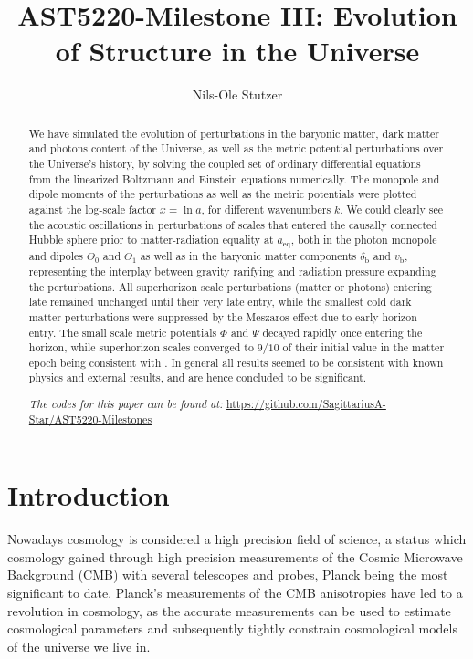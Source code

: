 \documentclass[twocolumn]{aastex62}
\begin{document}
\title{\Large AST5220-Milestone III: Evolution of Structure in the Universe}

\author{Nils-Ole Stutzer}

\begin{abstract}
    We have simulated the evolution of perturbations in the baryonic matter, dark matter and photons content of the Universe, as well as the metric potential perturbations over the Universe's history, by solving the coupled set of ordinary differential equations from the linearized Boltzmann and Einstein equations numerically. The monopole and dipole moments of the perturbations as well as the metric potentials were plotted against the log-scale factor $x = \ln a$, for different wavenumbers $k$. We could clearly see the acoustic oscillations in perturbations of scales that entered the causally connected Hubble sphere prior to matter-radiation equality at $a_\text{eq}$, both in the photon monopole and dipoles $\Theta_0$ and $\Theta_1$ as well as in the baryonic matter components $\delta_\text{b}$ and $v_\text{b}$, representing the interplay between gravity rarifying and radiation pressure expanding the perturbations. All superhorizon scale perturbations (matter or photons) entering late remained unchanged until their very late entry, while the smallest cold dark matter perturbations were suppressed by the Meszaros effect due to early horizon entry. The small scale metric potentials $\Phi$ and $\Psi$ decayed rapidly once entering the horizon, while superhorizon scales converged to $9/10$ of their initial value in the matter epoch being consistent with \cite{dodelson:2003}. In general all results seemed to be consistent with known physics and external results, and are hence concluded to be significant.


    \textit{The codes for this paper can be found at:} \newline \url{https://github.com/SagittariusA-Star/AST5220-Milestones}
\end{abstract}

\section{Introduction} \label{sec:Intro}
Nowadays cosmology is considered a high precision field of science, a status which cosmology gained through high precision measurements of the Cosmic Microwave Background (CMB) with several telescopes and probes, Planck \citep[]{planckcollaboration:2018} being the most significant to date. Planck's measurements of the CMB anisotropies have led to a revolution in cosmology, as the accurate measurements can be used to estimate cosmological parameters and subsequently tightly constrain cosmological models of the universe we live in.
\end{document}
